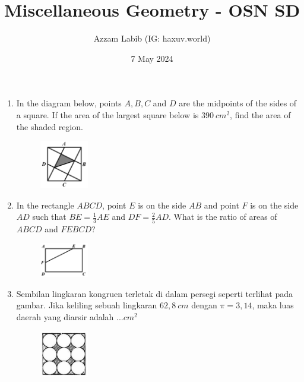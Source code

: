 \documentclass[11pt]{scrartcl}
\title{Miscellaneous Geometry - OSN SD}
\author{Azzam Labib (IG: haxuv.world)}
\date{7 May 2024}
\begin{document}
\maketitle

\begin{enumerate}
\item In the diagram below, points $A, B, C$ and $D$ are the midpoints of the sides of a square. If the area of the largest square below is $390\ cm^2$, find the area of the shaded region.
\begin{figure}[h]
\centering
\includegraphics[width=0.2\textwidth]{StarGen/0Figure/shaded-chopped-rectangle.png}
\end{figure}

\vspace{4cm}\item In the rectangle $ABCD$, point $E$ is on the side $AB$ and point $F$ is on the side $AD$ such that $BE = \frac{1}{3} AE$ and $DF = \frac{2}{5} AD$. What is the ratio of areas of $ABCD$ and $FEBCD$?
\begin{figure}[h]
\centering
\includegraphics[width=0.2\textwidth]{StarGen/0Figure/chopped-rectangle.png}
\end{figure}

\vspace{6cm}\item Sembilan lingkaran kongruen terletak di dalam persegi seperti terlihat pada gambar. Jika keliling sebuah lingkaran $ 62,8\ cm $ dengan $ \pi = 3,14 $, maka luas daerah yang diarsir adalah ...$ cm^2 $
\begin{figure}[h]
\centering
\includegraphics[width=0.2\textwidth]{StarGen/0Figure/9-lingkaran.png}
\end{figure}


\end{enumerate}
\end{document}
